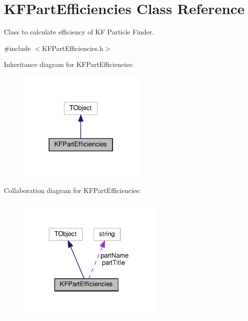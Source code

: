\hypertarget{classKFPartEfficiencies}{}\section{K\+F\+Part\+Efficiencies Class Reference}
\label{classKFPartEfficiencies}


Class to calculate efficiency of KF Particle Finder.  




{\ttfamily \#include $<$K\+F\+Part\+Efficiencies.\+h$>$}



Inheritance diagram for K\+F\+Part\+Efficiencies\+:\nopagebreak
\begin{figure}[H]
\begin{center}
\leavevmode
\includegraphics[width=178pt]{classKFPartEfficiencies__inherit__graph}
\end{center}
\end{figure}


Collaboration diagram for K\+F\+Part\+Efficiencies\+:\nopagebreak
\begin{figure}[H]
\begin{center}
\leavevmode
\includegraphics[width=203pt]{classKFPartEfficiencies__coll__graph}
\end{center}
\end{figure}
